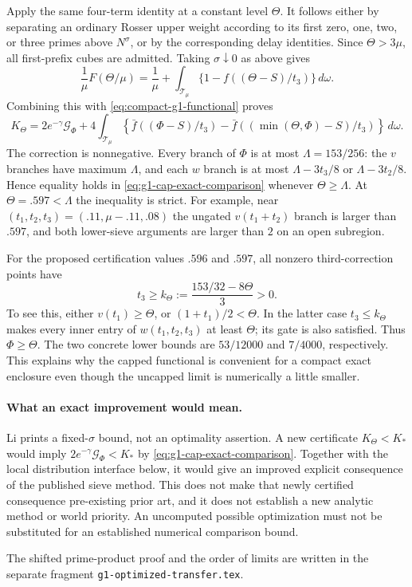 Apply the same four-term identity at a constant level $\Theta$.
It follows either by separating an ordinary Rosser upper weight
according to its first zero, one, two, or three primes above
$N^\sigma$, or by the corresponding delay identities. Since
$\Theta>3\mu$, all first-prefix cubes are admitted. Taking
$\sigma\downarrow0$ as above gives
\[
 \frac1\mu F(\Theta/\mu)
 =\frac1\mu+\int_{\mathcal T_\mu}
          \{1-f((\Theta-S)/t_3)\}\,d\omega.
\]
Combining this with \eqref{eq:compact-g1-functional} proves
\begin{equation}\label{eq:g1-cap-exact-comparison}
 K_\Theta=2e^{-\gamma}\mathcal G_\Phi+
 4\int_{\mathcal T_\mu}
       \left\{\bar f((\Phi-S)/t_3)
             -\bar f((\min(\Theta,\Phi)-S)/t_3)\right\}\,d\omega.
\end{equation}
The correction is nonnegative. Every branch of $\Phi$ is at most
$\Lambda=153/256$: the $v$ branches have maximum $\Lambda$, and
each $w$ branch is at most $\Lambda-3t_3/8$ or
$\Lambda-3t_2/8$. Hence equality holds in
\eqref{eq:g1-cap-exact-comparison} whenever $\Theta\ge\Lambda$.
At $\Theta=.597<\Lambda$ the inequality is strict. For example,
near $(t_1,t_2,t_3)=(.11,\mu-.11,.08)$ the ungated
$v(t_1+t_2)$ branch is larger than $.597$, and both lower-sieve
arguments are larger than $2$ on an open subregion.

For the proposed certification values $.596$ and $.597$, all
nonzero third-correction points have
\[
 t_3\ge k_\Theta:=\frac{153/32-8\Theta}{3}>0.
\]
To see this, either $v(t_1)\ge\Theta$, or
$(1+t_1)/2<\Theta$. In the latter case $t_3\le k_\Theta$
makes every inner entry of $w(t_1,t_2,t_3)$ at least $\Theta$;
its gate is also satisfied. Thus $\Phi\ge\Theta$.
The two concrete lower bounds are $53/12000$ and $7/4000$,
respectively. This explains why the capped functional is convenient
for a compact exact enclosure even though the uncapped limit is
numerically a little smaller.

\paragraph{What an exact improvement would mean.}
Li prints a fixed-$\sigma$ bound, not an optimality assertion.
A new certificate $K_\Theta<K_*$ would imply
$2e^{-\gamma}\mathcal G_\Phi<K_*$ by
\eqref{eq:g1-cap-exact-comparison}. Together with the local
distribution interface below, it would give an improved explicit
consequence of the published sieve method. This does not make
that newly certified consequence pre-existing prior art, and it
does not establish a new analytic method or world priority.
An uncomputed possible optimization must not be substituted for
an established numerical comparison bound.

The shifted prime-product proof and the order of limits are written
in the separate fragment \texttt{g1-optimized-transfer.tex}.
